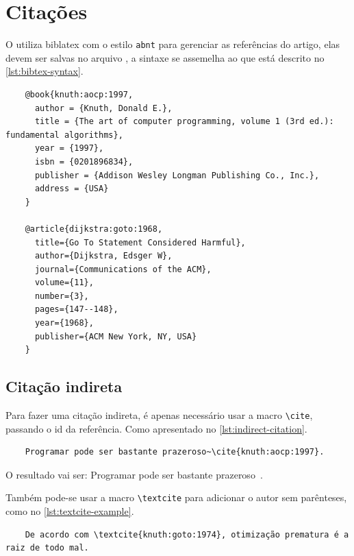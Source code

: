 \section{Citações}

O \template{} utiliza biblatex com o estilo \texttt{abnt} para gerenciar as referências do artigo, elas devem ser salvas no arquivo \bibfile, a sintaxe se assemelha ao que está descrito no \autoref{lst:bibtex-syntax}.

\begin{listing}[htb]
  \begin{verbatim}
    @book{knuth:aocp:1997,
      author = {Knuth, Donald E.},
      title = {The art of computer programming, volume 1 (3rd ed.): fundamental algorithms},
      year = {1997},
      isbn = {0201896834},
      publisher = {Addison Wesley Longman Publishing Co., Inc.},
      address = {USA}
    }

    @article{dijkstra:goto:1968,
      title={Go To Statement Considered Harmful},
      author={Dijkstra, Edsger W},
      journal={Communications of the ACM},
      volume={11},
      number={3},
      pages={147--148},
      year={1968},
      publisher={ACM New York, NY, USA}
    }
  \end{verbatim}
  \caption{Sintaxe BibTeX}
  \label{lst:bibtex-syntax}
\end{listing}

\subsection{Citação indireta}

Para fazer uma citação indireta, é apenas necessário usar a macro \texttt{\textbackslash{}cite}, passando o id da referência. Como apresentado no \autoref{lst:indirect-citation}.

\begin{listing}[htb]
  \begin{verbatim}
    Programar pode ser bastante prazeroso~\cite{knuth:aocp:1997}.
  \end{verbatim}
  \caption{Citação indireta}
  \label{lst:indirect-citation}
\end{listing}

O resultado vai ser: Programar pode ser bastante prazeroso~\cite{knuth:aocp:1997}.

Também pode-se usar a macro \texttt{\textbackslash{}textcite} para adicionar o autor sem parênteses, como no \autoref{lst:textcite-example}.

\begin{listing}[htb]
  \begin{verbatim}
    De acordo com \textcite{knuth:goto:1974}, otimização prematura é a raiz de todo mal.
  \end{verbatim}
  \caption{Citação com textcite}
  \label{lst:textcite-example}
\end{listing}

